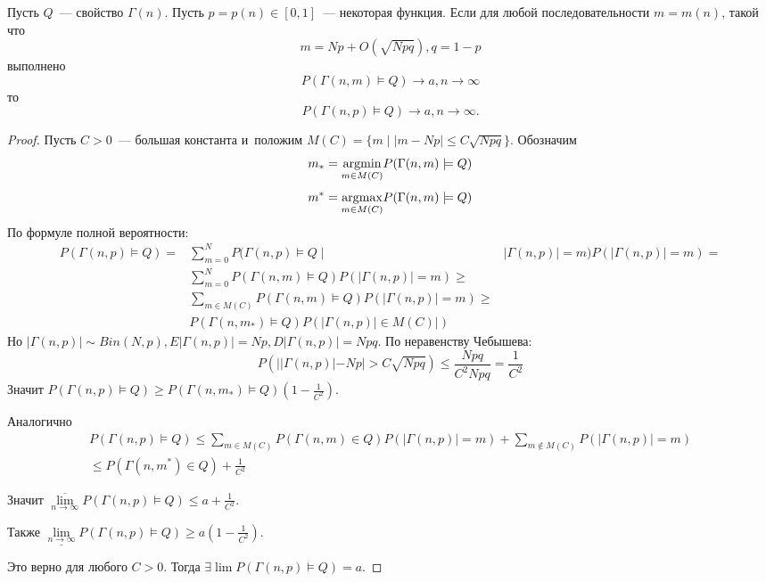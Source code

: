 \documentclass{article}
\begin{document}
\begin{lemma}
	Пусть $Q$~--- свойство $\Gamma(n)$. Пусть $p = p(n) \in [0, 1]$~--- некоторая
	функция. Если для любой последовательности $m = m(n)$, такой что
	$$ m = Np + O(\sqrt{Npq}), q = 1 - p$$ выполнено
	$$P(\Gamma(n, m) \models Q) \rightarrow a, n \rightarrow \infty$$
	то
	$$P(\Gamma(n, p) \models Q) \rightarrow a, n \rightarrow \infty.$$
\end{lemma}
\begin{proof}
	Пусть $C > 0$~--- большая константа и~положим $M(C) = \{m \mid |m - Np| \le
	C\sqrt{Npq}\}$. Обозначим
	$$ m_\ast = \underset{m \in M(C)}{\operatorname{argmin}} P(\Gamma(n, m) \models Q) $$
	$$ m^\ast = \underset{m \in M(C)}{\operatorname{argmax}} P(\Gamma(n, m) \models Q) $$
	По формуле полной вероятности:
	\begin{align*}
		P(\Gamma(n, p) \models Q) = &\sum\limits_{m=0}^N P(\Gamma(n,p) \models Q \mid
		& |\Gamma(n, p)| = m) P(|\Gamma(n, p)| = m) = \\
		& \sum\limits_{m=0}^N P(\Gamma(n,m) \models Q) P(|\Gamma(n,p)|=m) \ge \\
		& \sum\limits_{m \in M(C)} P(\Gamma(n,m) \models Q) P(|\Gamma(n,p)|=m) \ge \\
		& P(\Gamma(n, m_\ast) \models Q) P(|\Gamma(n, p)| \in M(C)|)
	\end{align*}
	Но $|\Gamma(n, p)| \sim Bin(N, p), E|\Gamma(n, p)| = Np, D|\Gamma(n, p)| =
	Npq$. По неравенству Чебышева:
	$$ P(||\Gamma(n, p)| - Np| > C\sqrt{Npq}) \le \frac{Npq}{C^2Npq} =
	\frac{1}{C^2} $$
	Значит $P(\Gamma(n, p) \models Q) \ge P(\Gamma(n,m_\ast) \models Q)\left(
	1 - \frac{1}{C^2}\right)$.

	Аналогично
	\begin{multline*}
		P(\Gamma(n, p) \models Q) \le
		\sum\limits_{m \in M(C)} P(\Gamma(n,m) \in Q) P(|\Gamma(n,p)| = m) +
		\sum\limits_{m \notin M(C)} P(|\Gamma(n,p)| = m) \\
		\le P(\Gamma(n,m^\ast) \in Q) + \frac{1}{C^2}
	\end{multline*}

	Значит $\overline{\lim\limits_{n\rightarrow \infty}} P(\Gamma(n, p) \models Q)
	\le a + \frac{1}{C^2}$.

	Также $\underline{\lim\limits_{n \rightarrow \infty}} P(\Gamma(n, p) \models Q)
	\ge a(1 - \frac{1}{C^2})$.

	Это верно для любого $C > 0$. Тогда $\exists \lim P(\Gamma(n, p) \models Q) =
	a$.
\end{proof}
\end{document}
